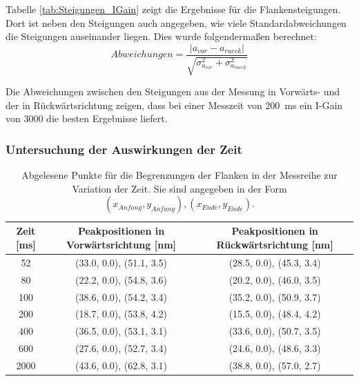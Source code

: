 \documentclass[12pt,a4paper]{article}
\begin{document}
Tabelle \ref{tab:Steigungen_IGain} zeigt die Ergebnisse für die Flankensteigungen. Dort ist neben den Steigungen auch angegeben, wie viele Standardabweichungen die Steigungen auseinander liegen. Dies wurde folgendermaßen berechnet:
\begin{equation}
\label{eq:stds}
Abweichungen = \dfrac{|a_{vor} - a_{rueck}|}{\sqrt{\sigma _{a_{vor}}^2 + \sigma _{a_{rueck}}^2}}
\end{equation}

Die Abweichungen zwischen den Steigungen aus der Messung in Vorwärts- und der in Rückwärtsrichtung zeigen, dass bei einer Messzeit von \SI{200}{ms} ein I-Gain von 3000 die besten Ergebnisse liefert.

\subsubsection{Untersuchung der Auswirkungen der Zeit}

\begin{table}
\centering
\begin{tabular}{|c|c|c|}
\hline 
Zeit [ms] & Peakpositionen in Vorwärtsrichtung [nm] & Peakpositionen in Rückwärtsrichtung [nm] \\ 
\hline 
52 & (33.0, 0.0), (51.1, 3.5) & (28.5, 0.0), (45.3, 3.4) \\
\hline 
80 & (22.2, 0.0), (54.8, 3.6) & (20.2, 0.0), (46.0, 3.5) \\ 
\hline 
100 & (38.6, 0.0), (54.2, 3.4) & (35.2, 0.0), (50.9, 3.7) \\
\hline 
200 & (18.7, 0.0), (53.8, 4.2) & (15.5, 0.0), (48.4, 4.2) \\
\hline 
400 & (36.5, 0.0), (53.1, 3.1) & (33.6, 0.0), (50.7, 3.5) \\
\hline 
600 & (27.6, 0.0), (52.7, 3.4) & (24.6, 0.0), (48.6, 3.3) \\
\hline 
2000 & (43.6, 0.0), (62.8, 3.1) & (38.8, 0.0), (57.0, 2.7) \\
\hline 
\end{tabular} 
\caption{Abgelesene Punkte für die Begrenzungen der Flanken in der Messreihe zur Variation der Zeit. Sie sind angegeben in der Form $(x_{Anfang},y_{Anfang}),(x_{Ende},y_{Ende})$.}
\label{tab:Peaks_Zeit}
\end{table}
\end{document}
